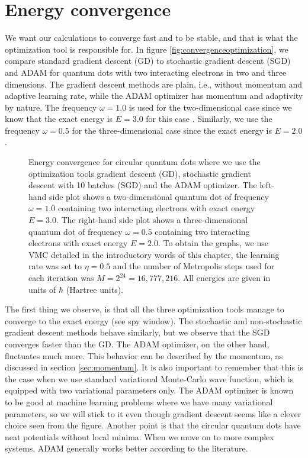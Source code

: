 \section{Energy convergence}
We want our calculations to converge fast and to be stable, and that is what the optimization tool is responsible for. In figure \eqref{fig:convergenceoptimization}, we compare standard gradient descent (GD) to stochastic gradient descent (SGD) and ADAM for quantum dots with two interacting electrons in two and three dimensions. The gradient descent methods are plain, i.e., without momentum and adaptive learning rate, while the ADAM optimizer has momentum and adaptivity by nature. The frequency $\omega=1.0$ is used for the two-dimensional case since we know that the exact energy is $E=3.0$ for this case \cite{taut_two_1993}. Similarly, we use the frequency $\omega=0.5$ for the three-dimensional case since the exact energy is $E=2.0$ \cite{taut_two_1994}. 

\begin{figure}[h]
	\centering 
	\subfloat{{}}
	\caption{Energy convergence for circular quantum dots where we use the optimization tools gradient descent (GD), stochastic gradient descent with 10 batches (SGD) and the ADAM optimizer. The left-hand side plot shows a two-dimensional quantum dot of frequency $\omega=1.0$ containing two interacting electrons with exact energy $E=3.0$. The right-hand side plot shows a three-dimensional quantum dot of frequency $\omega=0.5$ containing two interacting electrons with exact energy $E=2.0$. To obtain the graphs, we use VMC detailed in the introductory words of this chapter, the learning rate was set to $\eta=0.5$ and the number of Metropolis steps used for each iteration was $M=2^{24}=16,777,216$. All energies are given in units of $\hbar$ (Hartree units).}
	\label{fig:convergenceoptimization}
\end{figure} 

The first thing we observe, is that all the three optimization tools manage to converge to the exact energy (see spy window). The stochastic and non-stochastic gradient descent methods behave similarly, but we observe that the SGD converges faster than the GD. The ADAM optimizer, on the other hand, fluctuates much more. This behavior can be described by the momentum, as discussed in section \ref{sec:momentum}. It is also important to remember that this is the case when we use standard variational Monte-Carlo wave function, which is equipped with two variational parameters only. The ADAM optimizer is known to be good at machine learning problems where we have many variational parameters, so we will stick to it even though gradient descent seems like a clever choice seen from the figure. Another point is that the circular quantum dots have neat potentials without local minima. When we move on to more complex systems, ADAM generally works better according to the literature. 

